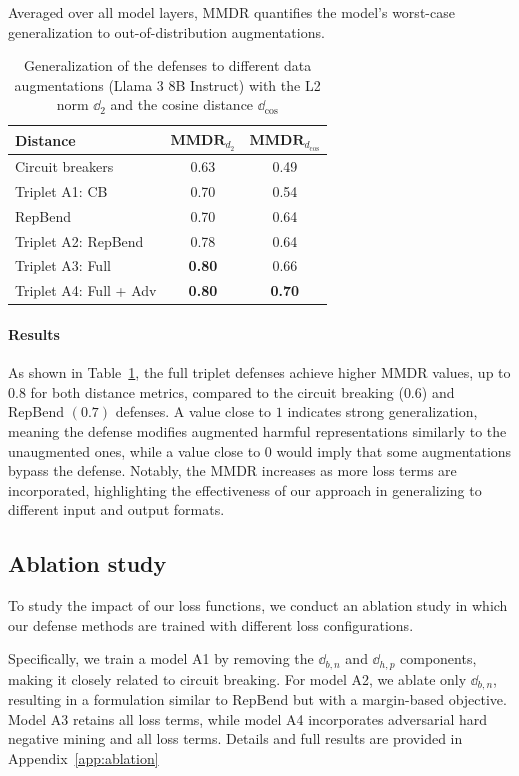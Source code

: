 \documentclass[11pt]{article}
\begin{document}
Averaged over all model layers, MMDR quantifies the model's worst-case generalization to out-of-distribution augmentations.

\begin{table}[htbp]
\centering
\setlength{\tabcolsep}{3pt} %
\begin{tabular}{lcc}
\hline
\textbf{Distance} & {$\mathbf{MMDR}_{d_2}$} & {$\mathbf{MMDR}_{d_\mathrm{cos}}$} \\
\hline
Circuit breakers & 0.63 & 0.49 \\
Triplet A1: CB & 0.70 & 0.54 \\
RepBend & 0.70 & 0.64 \\
Triplet A2: RepBend & 0.78 & 0.64 \\
Triplet A3: Full & \textbf{0.80} & 0.66 \\
Triplet A4: Full + Adv & \textbf{0.80} & \textbf{0.70} \\
\hline
\end{tabular}
\caption{Generalization of the defenses to different data augmentations (Llama 3 8B Instruct) with the L2 norm $\dd_2$ and the cosine distance $\dd_{\mathrm{cos}}$}
\label{tab:generalization}
\end{table}

\paragraph{Results}

As shown in Table~\ref{tab:generalization}, the full triplet defenses achieve higher MMDR values,
up to $0.8$ for both distance metrics, compared to the circuit breaking ($0.6$) and RepBend $(0.7)$ defenses.
A value close to $1$ indicates strong generalization, meaning the defense modifies augmented
harmful representations similarly to the unaugmented ones, while a value close to $0$ would imply that some augmentations bypass the defense.
Notably, the MMDR increases as more loss terms are incorporated, highlighting the effectiveness of our approach in generalizing to different input and output formats.

\subsection{Ablation study}

To study the impact of our loss functions, we conduct an ablation study in which our defense methods are trained with different loss configurations. 

Specifically, we train a model A1 by removing the $\dd_{b,n}$ and $\dd_{h, p}$ components, making it closely related to circuit breaking.
For model A2, we ablate only $\dd_{b, n}$, resulting in a formulation similar to RepBend but with a margin-based objective.
Model A3 retains all loss terms, while model A4 incorporates adversarial hard negative mining and all loss terms.
Details and full results are provided in Appendix~\ref{app:ablation}
\end{document}
